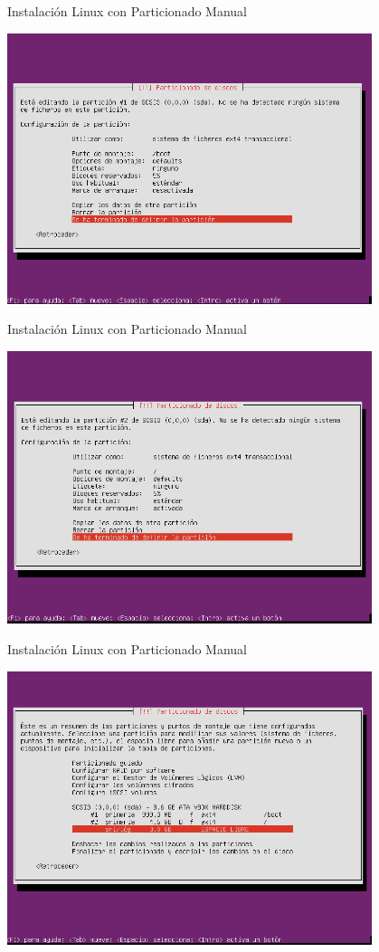 \begin{frame}{Instalación Linux con Particionado Manual}
 \begin{center}
  \includegraphics[width=0.8\textwidth]{images/install11.png}
 \end{center}
\end{frame}

\begin{frame}{Instalación Linux con Particionado Manual}
 \begin{center}
  \includegraphics[width=0.8\textwidth]{images/install12.png}
 \end{center}
\end{frame}

\begin{frame}{Instalación Linux con Particionado Manual}
 \begin{center}
  \includegraphics[width=0.8\textwidth]{images/install13.png}
 \end{center}
\end{frame}

